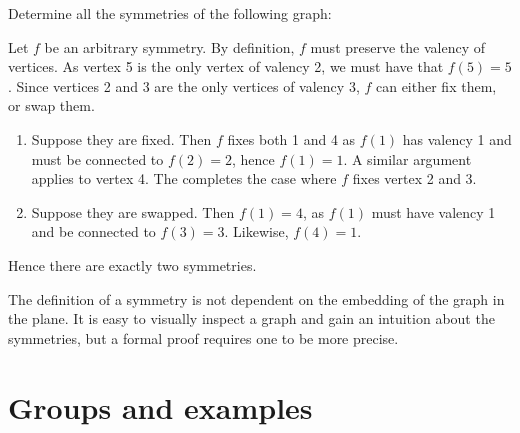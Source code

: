 \documentclass[12pt]{report}
\newenvironment{note}{\begin{bluebox}}{\end{bluebox}}
\begin{document}
\begin{example}
  Determine all the symmetries of the following graph:

  \begin{centre}
  \end{centre}

  Let \(f\) be an arbitrary symmetry. By definition, \(f\) must preserve the valency of vertices. As vertex 5 is the only vertex of valency 2, we must have that \(f(5) = 5\). Since vertices 2 and 3 are the only vertices of valency 3, \(f\) can either fix them, or swap them.
  \begin{enumerate}
    \item Suppose they are fixed. Then \(f\) fixes both 1 and 4 as \(f(1)\) has valency 1 and must be connected to \(f(2) = 2\), hence \(f(1) = 1\). A similar argument applies to vertex 4. The completes the case where \(f\) fixes vertex 2 and 3.
    \item Suppose they are swapped. Then \(f(1) = 4\), as \(f(1)\) must have valency 1 and be connected to \(f(3) = 3\). Likewise, \(f(4) = 1\).
  \end{enumerate}

  Hence there are exactly two symmetries.
\end{example}

\begin{note}
  The definition of a symmetry is not dependent on the embedding of the graph in the plane. It is easy to visually inspect a graph and gain an intuition about the symmetries, but a formal proof requires one to be more precise.
\end{note}


\section{Groups and examples}
\end{document}
